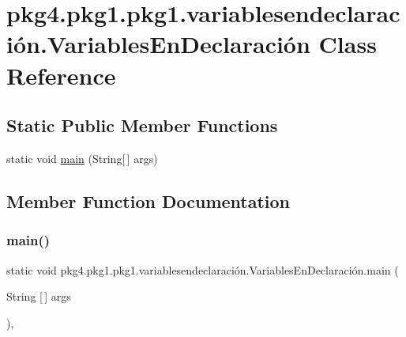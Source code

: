 \hypertarget{classpkg4_1_1pkg1_1_1pkg1_1_1variablesendeclaraci_xC3_xB3n_1_1_variables_en_declaraci_xC3_xB3n}{}\section{pkg4.\+pkg1.\+pkg1.\+variablesendeclaración.\+Variables\+En\+Declaración Class Reference}
\label{classpkg4_1_1pkg1_1_1pkg1_1_1variablesendeclaraci_xC3_xB3n_1_1_variables_en_declaraci_xC3_xB3n}
\subsection*{Static Public Member Functions}
\begin{DoxyCompactItemize}
\item 
static void \mbox{\hyperlink{classpkg4_1_1pkg1_1_1pkg1_1_1variablesendeclaraci_xC3_xB3n_1_1_variables_en_declaraci_xC3_xB3n_aa56f7c92eb4586483556321481c24495}{main}} (String\mbox{[}$\,$\mbox{]} args)
\end{DoxyCompactItemize}


\subsection{Member Function Documentation}
\mbox{\label{classpkg4_1_1pkg1_1_1pkg1_1_1variablesendeclaraci_xC3_xB3n_1_1_variables_en_declaraci_xC3_xB3n_aa56f7c92eb4586483556321481c24495}} 
\subsubsection{\texorpdfstring{main()}{main()}}
{\footnotesize\ttfamily static void pkg4.\+pkg1.\+pkg1.\+variablesendeclaración.\+Variables\+En\+Declaración.\+main (\begin{DoxyParamCaption}\item[{String \mbox{[}$\,$\mbox{]}}]{args }\end{DoxyParamCaption})\hspace{0.3cm}{\ttfamily [inline]}, {\ttfamily [static]}}


